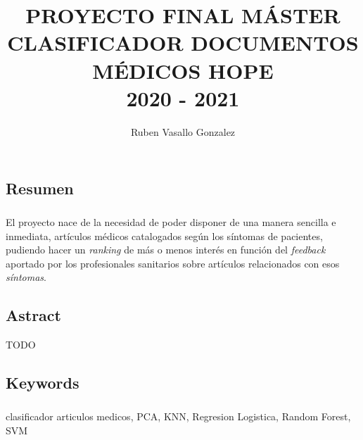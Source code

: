 \documentclass[10pt,a4paper,oneside]{book}
\author{Ruben Vasallo Gonzalez}
\title{PROYECTO FINAL MÁSTER \\ CLASIFICADOR DOCUMENTOS MÉDICOS HOPE \\ 2020 - 2021}
\begin{document}
\maketitle

\tableofcontents

\newpage
\chapter{}

\section{Resumen}

\paragraph{}
El proyecto nace de la necesidad de poder disponer de una manera sencilla e inmediata, artículos médicos catalogados según los síntomas de pacientes, pudiendo hacer un \textit{ranking} de más o menos interés en función del \textit{feedback} aportado por los profesionales sanitarios sobre artículos relacionados con esos \textit{síntomas}.

\section{Astract}
TODO

\section{Keywords}

\paragraph{}
clasificador articulos medicos, PCA, KNN, Regresion Logistica, Random Forest, SVM

\newpage
\end{document}
